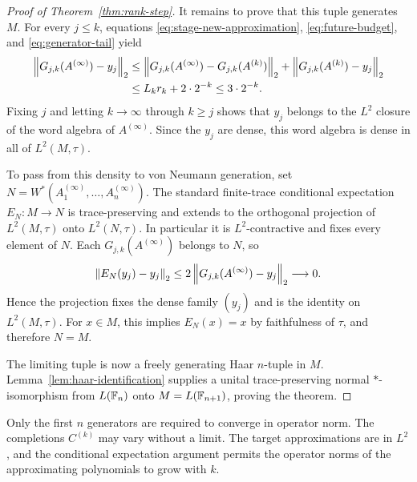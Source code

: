 \begin{proof}[Proof of Theorem~\ref{thm:rank-step}]
It remains to prove that this tuple generates $M$.  For every
$j\leq k$, equations \eqref{eq:stage-new-approximation},
\eqref{eq:future-budget}, and \eqref{eq:generator-tail} yield
\begin{align}
\label{eq:limit-target-approximation}
 \left\lVert G_{j,k}(A^{(\infty)})-y_j\right\rVert_2
 &\leq
 \left\lVert G_{j,k}(A^{(\infty)})-G_{j,k}(A^{(k)})\right\rVert_2
  +\left\lVert G_{j,k}(A^{(k)})-y_j\right\rVert_2
 \notag\\
 &\leq L_k r_k+2\cdot2^{-k}
 \leq3\cdot2^{-k}.
\end{align}
Fixing $j$ and letting $k\to\infty$ through $k\geq j$ shows that
$y_j$ belongs to the $L^2$ closure of the word algebra of
$A^{(\infty)}$.  Since the $y_j$ are dense, this word algebra is
dense in all of $L^2(M,\tau)$.

To pass from this density to von Neumann generation, set
$N=W^*(A_1^{(\infty)},\ldots,A_n^{(\infty)})$.  The standard
finite-trace conditional expectation $E_N:M\to N$ is
trace-preserving and extends to the orthogonal projection of
$L^2(M,\tau)$ onto $L^2(N,\tau)$.  In particular it is
$L^2$-contractive and fixes every element of $N$.
Each $G_{j,k}(A^{(\infty)})$ belongs to $N$, so
\[
 \left\lVert E_N(y_j)-y_j\right\rVert_2
 \leq 2\left\lVert G_{j,k}(A^{(\infty)})-y_j\right\rVert_2
 \longrightarrow0.
\]
Hence the projection fixes the dense family $(y_j)$ and is the
identity on $L^2(M,\tau)$.  For $x\in M$, this implies
$E_N(x)=x$ by faithfulness of $\tau$, and therefore $N=M$.

The limiting tuple is now a freely generating Haar $n$-tuple in
$M$.  Lemma~\ref{lem:haar-identification} supplies a unital
trace-preserving normal $*$-isomorphism from $L(\mathbb F_n)$ onto
$M=L(\mathbb F_{n+1})$, proving the theorem.
\end{proof}

\begin{remark}
Only the first $n$ generators are required to converge in operator
norm.  The completions $C^{(k)}$ may vary without a limit.
The target approximations are in $L^2$, and the conditional
expectation argument permits the operator norms of the
approximating polynomials to grow with $k$.
\end{remark}
